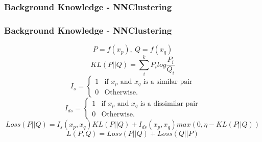 \documentclass{beamer}
\begin{document}
\begin{frame}
\frametitle{Background Knowledge - NNClustering}
\begin{figure}[!h]
  \centering
  
  \label{fig:archi}
\end{figure}
\end{frame}
\begin{frame}
\frametitle{Background Knowledge - NNClustering}
\begin{equation*}
  P = f(x_p), ~ Q = f(x_q)
\end{equation*}
\pause
\begin{equation*}
  KL(P||Q) = \sum_i^k P_ilog\frac{P_i}{Q_i}
\end{equation*}
\pause
\begin{equation*}
  I_s = \left\{
\begin{array}{ll}
  1 & \mbox{if $x_p$ and $x_q$ is a similar pair}\\
  0 & \mbox{Otherwise.}
\end{array}
\right.
\end{equation*}
%
\begin{equation*}
  I_{ds} = \left\{
\begin{array}{ll}
  1 & \mbox{if $x_p$ and $x_q$ is a dissimilar pair}\\
  0 & \mbox{Otherwise.}
\end{array}
\right.
\end{equation*}
\begin{equation*}
  Loss(P || Q) = I_s(x_p, x_q)KL(P || Q) + I_{ds}(x_p, x_q)max(0,
  \eta-KL(P||Q))
\end{equation*}
\begin{equation*}
  L(P,Q) = Loss(P || Q) + Loss(Q || P)
\end{equation*}
\end{frame}
\end{document}
